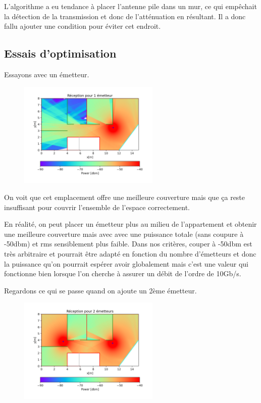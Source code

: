 \documentclass[sn-mathphys-num]{sn-jnl}
\begin{document}
L'algorithme a eu tendance à placer l'antenne pile dans un mur, ce qui empêchait la détection
de la transmission et donc de l'atténuation en résultant. Il a donc fallu ajouter une condition
pour éviter cet endroit.





\subsection{Essais d'optimisation}

Essayons avec un émetteur.

\begin{figure}[H]
    \centering
    \includegraphics[width=0.6\textwidth]{images/optimize/1_dbm.png}
\end{figure}

On voit que cet emplacement offre une meilleure couverture mais que ça reste insuffisant pour
couvrir l'ensemble de l'espace correctement. 

En réalité, on peut placer un émetteur plus au milieu de 
l'appartement et obtenir une meilleure couverture mais avec 
avec une puissance totale (sans coupure à -50dbm) et rms sensiblement plus faible.
Dans nos critères, couper à -50dbm est très arbitraire et pourrait être
adapté en fonction du nombre d'émetteurs et donc
la puissance qu'on pourrait espérer avoir globalement mais c'est une valeur
qui fonctionne bien lorsque l'on cherche à assurer un débit de l'ordre de 10Gb/s.

Regardons ce qui se passe quand on ajoute un 2ème émetteur.

\begin{figure}[H]
    \centering
    \includegraphics[width=0.6\textwidth]{images/optimize/2_dbm.png}
\end{figure}
\end{document}
